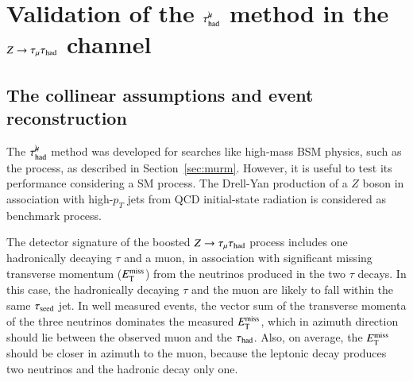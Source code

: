 \FloatBarrier

\section{Validation of the $\tau_\mathrm{had}^{\mu\mkern-10mu\backslash}$ method in the $Z\rightarrow\tau_\mathrm{\mu}\tau_{\text{had}}$ channel} \label{sec:Zttbench}
    \subsection{The collinear assumptions and event reconstruction} \label{sec:collinear_assumptions_and_evt_reco}
        The $\tau_\mathrm{had}^{\mu\mkern-10mu\backslash}$ method was developed for searches like high-mass BSM physics, such as the \GHH process, 
        as described in Section~\ref{sec:murm}. However, it is useful to test its performance considering a SM process.
        The Drell-Yan production of a $Z$ boson in association with high-$p_T$ jets from QCD initial-state 
        radiation is considered as benchmark process.

        The detector signature of the boosted $Z\rightarrow\tau_\mathrm{\mu}\tau_{\text{had}}$ process includes one hadronically decaying $\tau$ and a muon, 
        in association with significant missing transverse momentum ($E_{\text{T}}^{\text{miss}}$) from the neutrinos produced in the two 
        $\tau$ decays. In this case, the hadronically decaying 
        $\tau$ and the muon are likely to fall within the same $\tau_\mathrm{seed}$ jet. In well measured events, the vector sum 
        of the transverse momenta of the three neutrinos dominates the measured $E_{\text{T}}^{\text{miss}}$, which in azimuth direction should lie 
        between the observed muon and the $\tau_{\text{had}}$. Also, on average, the $E_{\text{T}}^{\text{miss}}$ should be closer in azimuth to the muon, 
        because the leptonic decay produces two neutrinos and the hadronic decay only one.

